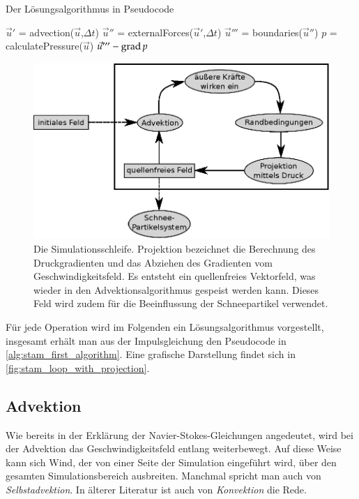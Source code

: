 \begin{algorithm}
\caption{Der Lösungsalgorithmus in Pseudocode}
\label{alg:stam_first_algorithm}
\begin{algorithmic}
	\State $\vec{u}'$ = advection($\vec{u}$,$\Delta t$)
	\State $\vec{u}''$ = externalForces($\vec{u}'$,$\Delta t$)
	\State $\vec{u}'''$ = boundaries($\vec{u}''$)
	\State $p$ = calculatePressure($\vec{u}$)
	\State \Return $\vec{u}''' - \operatorname*{grad} p$
\EndFunction
\end{algorithmic}
\end{algorithm}

\begin{figure}[h]
\centering
\includegraphics[width=12cm]{images/stam_loop_with_projection}
\caption{Die Simulationsschleife. Projektion bezeichnet die Berechnung des Druckgradienten und das Abziehen des Gradienten vom Geschwindigkeitsfeld. Es entsteht ein quellenfreies Vektorfeld, was wieder in den Advektionsalgorithmus gespeist werden kann. Dieses Feld wird zudem für die Beeinflussung der Schneepartikel verwendet.}
\label{fig:stam_loop_with_projection}
\end{figure}

Für jede Operation wird im Folgenden ein Lösungsalgorithmus
vorgestellt, insgesamt erhält man aus der Impulsgleichung den Pseudocode in
\autoref{alg:stam_first_algorithm}. Eine grafische Darstellung findet
sich in \autoref{fig:stam_loop_with_projection}.

\subsection{Advektion}
\label{sec:stam_advection}

Wie bereits in der Erklärung der Navier-Stokes-Gleichungen angedeutet, wird bei
der Advektion das Geschwindigkeitsfeld entlang 
weiterbewegt. Auf diese Weise kann sich Wind, der von einer Seite der
Simulation eingeführt wird, über den gesamten Simulationsbereich ausbreiten.
Manchmal spricht man auch von \emph{Selbstadvektion}. In älterer Literatur
ist auch von \emph{Konvektion} die Rede.

